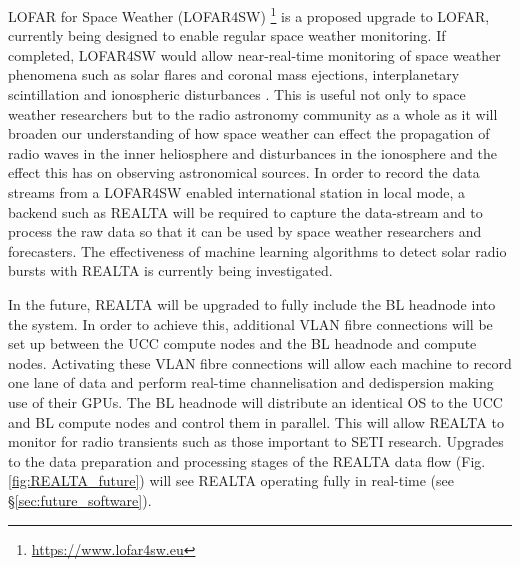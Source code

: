 LOFAR for Space Weather (LOFAR4SW) \footnote{\hyperref[LOFAR4SW]{https://www.lofar4sw.eu}} is a proposed upgrade to LOFAR, currently being designed to enable regular space weather monitoring. If completed, LOFAR4SW would allow near-real-time monitoring of space weather phenomena such as solar flares and coronal mass ejections, interplanetary scintillation and ionospheric disturbances \citep{Carley2020a}. This is useful not only to space weather researchers but to the radio astronomy community as a whole as it will broaden our understanding of how space weather can effect the propagation of radio waves in the inner heliosphere and disturbances in the ionosphere and the effect this has on observing astronomical sources. In order to record the data streams from a LOFAR4SW enabled international station in local mode, a backend such as REALTA will be required to capture the data-stream and to process the raw data so that it can be used by space weather researchers and forecasters. The effectiveness of machine learning algorithms to detect solar radio bursts with REALTA is currently being investigated.

In the future, REALTA will be upgraded to fully include the BL headnode into the system. In order to achieve this, additional VLAN fibre connections will be set up between the UCC compute nodes and the BL headnode and compute nodes. Activating these VLAN fibre connections will allow each machine to record one lane of data and perform real-time channelisation and dedispersion making use of their GPUs.  The BL headnode will distribute an identical OS to the UCC and BL compute nodes and control them in parallel. This will allow REALTA to monitor for radio transients such as those important to SETI research. Upgrades to the data preparation and processing stages of the REALTA data flow (Fig. \ref{fig:REALTA_future}) will see REALTA operating fully in real-time (see \S \ref{sec:future_software}). %

